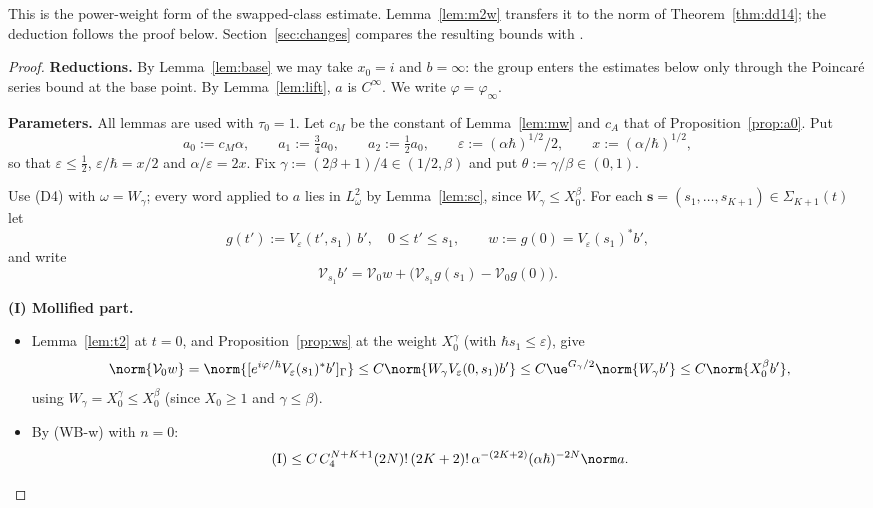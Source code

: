 \begin{remark}
This is the power-weight form of the swapped-class estimate. Lemma~\ref{lem:m2w} transfers it to the norm of
Theorem~\ref{thm:dd14}; the deduction follows the proof below. Section~\ref{sec:changes} compares the resulting bounds with \cite{S}.
\end{remark}

\begin{proof}
\medskip\noindent\textbf{Reductions.} By Lemma~\ref{lem:base} we may take $x_0=i$ and $b=\infty$: the group enters the estimates below only
through the Poincar\'e series bound at the base point. By Lemma~\ref{lem:lift}, $a$ is $C^\infty$. We write $\varphi=\varphi_\infty$.

\medskip\noindent\textbf{Parameters.} All lemmas are used with $\tau_0=1$. Let $c_M$ be the constant of Lemma~\ref{lem:mw} and $c_A$ that of
Proposition~\ref{prop:a0}. Put
\[
a_0:=c_M\alpha,\qquad a_1:=\tfrac34a_0,\qquad a_2:=\tfrac12a_0,\qquad\varepsilon:=(\alpha\hbar)^{1/2}/2,\qquad x:=(\alpha/\hbar)^{1/2},
\]
so that $\varepsilon\le\tfrac12$, $\varepsilon/\hbar=x/2$ and $\alpha/\varepsilon=2x$. Fix $\gamma:=(2\beta+1)/4\in(1/2,\beta)$ and put $\theta:=\gamma/\beta\in(0,1)$.

Use (D4) with $\omega=W_\gamma$; every word applied to $a$ lies in $L^2_\omega$ by Lemma~\ref{lem:sc}, since $W_\gamma\le X_0^\beta$. For each $\mathbf s=(s_1,\dots,s_{K+1})\in\Sigma_{K+1}(t)$ let
\[
g(t'):=V_\varepsilon(t',s_1)\,b',\quad0\le t'\le s_1,\qquad w:=g(0)=V_\varepsilon(s_1)^*b',
\]
and write
\[
\mathcal V_{s_1}b'=\mathcal V_0w+\bigl(\mathcal V_{s_1}g(s_1)-\mathcal V_0g(0)\bigr).
\]

\medskip\noindent\textbf{(I) Mollified part.}
\begin{itemize}
\item Lemma~\ref{lem:t2} at $t=0$, and Proposition~\ref{prop:ws} at the weight $X_0^\gamma$ (with $\hbar s_1\le\varepsilon$), give
\[
\norm{\mathcal V_0w}=\norm{[e^{i\varphi/\hbar}V_\varepsilon(s_1)^*b']_\Gamma}\le C\norm{W_\gamma V_\varepsilon(0,s_1)b'}\le C\ue^{G_\gamma/2}\norm{W_\gamma b'}\le C\norm{X_0^\beta b'},
\]
using $W_\gamma=X_0^\gamma\le X_0^\beta$ (since $X_0\ge1$ and $\gamma\le\beta$).
\item By (WB-w) with $n=0$:
\[
\text{(I)}\le C\,C_4^{N+K+1}(2N)!\,(2K+2)!\,\alpha^{-(2K+2)}(\alpha\hbar)^{-2N}\norm a.
\]
\end{itemize}


\end{proof}
